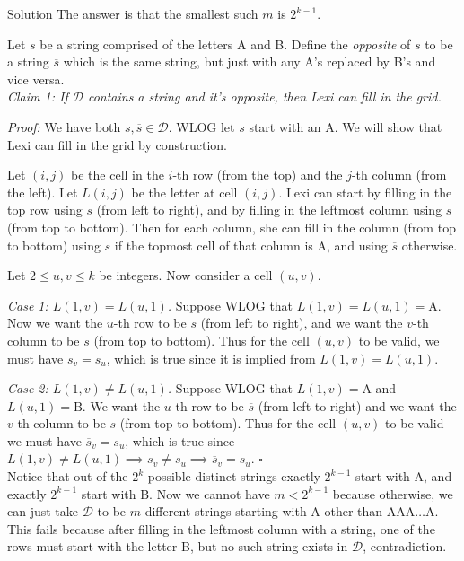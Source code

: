 \documentclass{article}
\begin{document}
\begin{solution}{Solution}
The answer is that the smallest such $m$ is $2^{k-1}$.\vspace{0.2cm}

Let $s$ be a string comprised of the letters A and B.
Define the \textit{opposite} of $s$ to be a string $\overline{s}$ which is
the same string, but just with any A's replaced by B's and vice versa.
\\

\textit{Claim 1: If $\mathcal{D}$ contains a string and it's opposite, then
Lexi can fill in the grid.}\vspace{0.2cm}

\textit{Proof:} We have both $s, \overline{s} \in \mathcal{D}$.
WLOG let $s$ start with an A. We will
show that Lexi can fill in the grid by construction.\vspace{0.2cm}

Let $(i, j)$ be the cell in the $i$-th row (from the top) and the
$j$-th column (from the left). Let $L(i,j)$ be the letter at cell $(i,j)$.
Lexi can start by filling in the top row
using $s$ (from left to right), and by filling in the leftmost column using
$s$ (from top to bottom). Then for each column, she can fill in the column
(from top to bottom) using $s$ if the topmost cell of that column is A, and
using $\overline{s}$ otherwise. \vspace{0.2cm}

Let $2\leq u,v \leq k$ be integers.
Now consider a cell $(u, v)$.
\vspace{0.2cm}

\textit{Case 1: $L(1, v) = L(u,1)$.}
Suppose WLOG that $L(1, v) = L(u, 1) = \text{A}$. Now we want the $u$-th row
to be $s$ (from left to right), and we want the $v$-th column to be $s$
(from top to bottom). Thus for the cell $(u,v)$ to be valid,
we must have $s_v = s_u$, which is true since it is implied from
$L(1,v) = L(u,1)$.
\vspace{0.2cm}

\textit{Case 2: $L(1,v)\neq L(u,1)$.}
Suppose WLOG that $L(1,v) = \text{A}$ and $L(u,1) = \text{B}$. We want the
$u$-th row to be $\overline{s}$ (from left to right) and we want the
$v$-th column to be $s$ (from top to bottom). Thus for the cell $(u,v)$ to
be valid we must have $\overline{s}_v = s_u$, which is true since
$L(1,v) \neq L(u,1) \implies s_v \neq s_u \implies \overline{s}_v = s_u$.
$\square$\\

Notice that out of the $2^k$ possible distinct strings exactly $2^{k-1}$
start with A, and exactly $2^{k-1}$ start with B.
Now we cannot have $m < 2^{k-1}$ because otherwise, we can just
take $\mathcal{D}$ to be $m$ different strings starting with A other than
$\text{AAA}\ldots\text{A}$. This fails because after filling in the leftmost
column with a string, one of the rows must start with the letter B, but no
such string exists in $\mathcal{D}$, contradiction.\vspace{0.2cm}


\end{solution}
\end{document}
